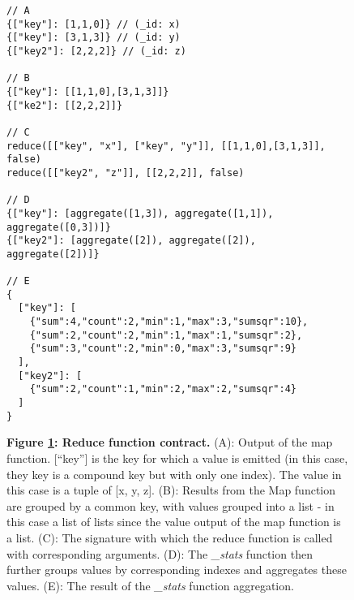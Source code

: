 \begin{figure}[H]
  \begin{verbatim}
// A
{["key"]: [1,1,0]} // (_id: x)
{["key"]: [3,1,3]} // (_id: y)
{["key2"]: [2,2,2]} // (_id: z)

// B
{["key"]: [[1,1,0],[3,1,3]]}
{["ke2"]: [[2,2,2]]}

// C
reduce([["key", "x"], ["key", "y"]], [[1,1,0],[3,1,3]], false)
reduce([["key2", "z"]], [[2,2,2]], false)

// D
{["key"]: [aggregate([1,3]), aggregate([1,1]),  aggregate([0,3])]}
{["key2"]: [aggregate([2]), aggregate([2]),  aggregate([2])]}

// E
{
  ["key"]: [
    {"sum":4,"count":2,"min":1,"max":3,"sumsqr":10},
    {"sum":2,"count":2,"min":1,"max":1,"sumsqr":2},
    {"sum":3,"count":2,"min":0,"max":3,"sumsqr":9}
  ],
  ["key2"]: [
    {"sum":2,"count":1,"min":2,"max":2,"sumsqr":4}
  ]
}
    \end{verbatim}
  \caption[\textit{\_stats} function contract]{\textbf{Figure \ref{stats-reduce-fn}: Reduce function contract.} (A): Output of the map function. [``key''] is the key for which a value is emitted (in this case, they key is a compound key but with only one index). The value in this case is a tuple of [x, y, z]. (B): Results from the Map function are grouped by a common key, with values grouped into a list - in this case a list of lists since the value output of the map function is a list. (C): The signature with which the reduce function is called with corresponding arguments. (D): The \textit{\_stats} function then further groups values by corresponding indexes and aggregates these values. (E): The result of the \textit{\_stats} function aggregation.}
  \label{stats-reduce-fn}
\end{figure}